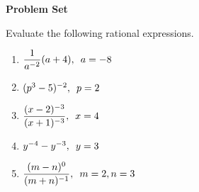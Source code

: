 \textbf{Problem Set}

\vspce

Evaluate the following  rational expressions.

\begin{enumerate}[label = \arabic*. ]

\item \hspce $\displaystyle \frac{1}{a^{-2}}(a+4),\hspace{0.5em} a=-8$
\item \hspce $(p^{3} - 5)^{-2},\hspace{0.5em} p=2$
\item \hspce $\displaystyle \frac{(x-2)^{-3}}{(x+1)^{-3}},\hspace{0.5em} x=4$
\item \hspce $y^{-4}-y^{-3},\hspace{0.5em} y=3$
\item \hspce $\displaystyle \frac{(m-n)^{0}}{(m+n)^{-1}},\hspace{0.5em} m=2, n=3$

\end{enumerate}